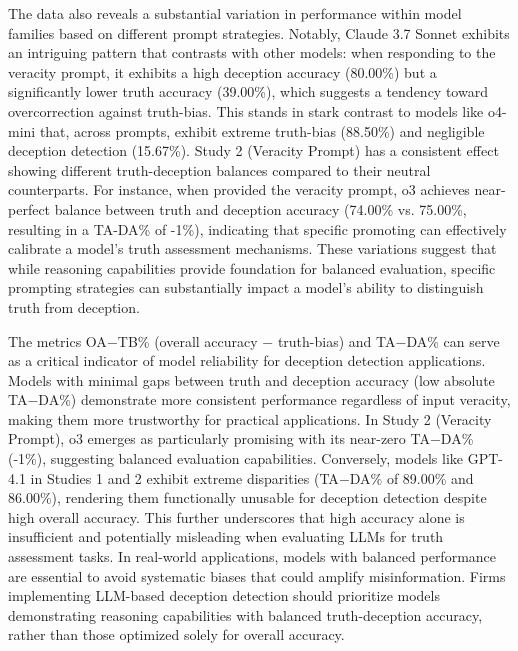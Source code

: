 \documentclass{article}
\begin{document}
The data also reveals a substantial variation in performance within model families based on different prompt strategies. Notably, Claude 3.7 Sonnet exhibits an intriguing pattern that contrasts with other models: when responding to the veracity prompt, it exhibits a high deception accuracy (80.00\%) but a significantly lower truth accuracy (39.00\%), which suggests a tendency toward overcorrection against truth-bias. This stands in stark contrast to models like o4-mini that, across prompts, exhibit extreme truth-bias (88.50\%) and negligible deception detection (15.67\%). Study 2 (Veracity Prompt) has a consistent effect showing different truth-deception balances compared to their neutral counterparts. For instance, when provided the veracity prompt, o3 achieves near-perfect balance between truth and deception accuracy (74.00\% vs. 75.00\%, resulting in a TA-DA\% of -1\%), indicating that specific promoting can effectively calibrate a model's truth assessment mechanisms. These variations suggest that while reasoning capabilities provide foundation for balanced evaluation, specific prompting strategies can substantially impact a model's ability to distinguish truth from deception.

The metrics OA$-$TB\% (overall accuracy $-$ truth-bias) and TA$-$DA\% can serve as a critical indicator of model reliability for deception detection applications. Models with minimal gaps between truth and deception accuracy (low absolute TA$-$DA\%) demonstrate more consistent performance regardless of input veracity, making them more trustworthy for practical applications. In Study 2 (Veracity Prompt), o3 emerges as particularly promising with its near-zero TA$-$DA\% (-1\%), suggesting balanced evaluation capabilities. Conversely, models like GPT-4.1 in Studies 1 and 2 exhibit extreme disparities (TA$-$DA\% of 89.00\% and 86.00\%), rendering them functionally unusable for deception detection despite high overall accuracy. This further underscores that high accuracy alone is insufficient and potentially misleading when evaluating LLMs for truth assessment tasks. In real-world applications, models with balanced performance are essential to avoid systematic biases that could amplify misinformation. Firms implementing LLM-based deception detection should prioritize models demonstrating reasoning capabilities with balanced truth-deception accuracy, rather than those optimized solely for overall accuracy.
\end{document}
